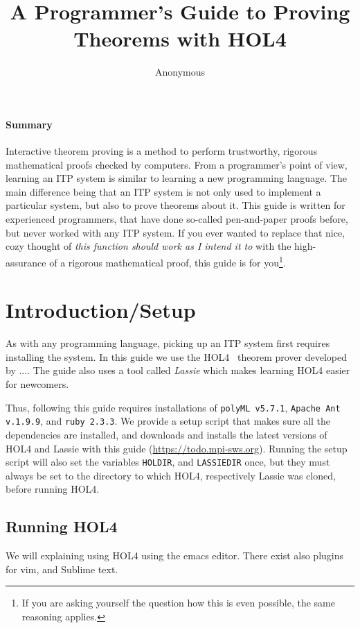 \documentclass[10pt]{scrartcl}
\title{A Programmer's Guide to Proving Theorems with HOL4}
\author{Anonymous}
\date{}
\begin{document}
\maketitle{}

\paragraph*{Summary}
Interactive theorem proving is a method to perform trustworthy, rigorous
mathematical proofs checked by computers.
From a programmer's point of view, learning an ITP system is similar to
learning a new programming language.
The main difference being that an ITP system is not only used to implement
a particular system, but also to prove theorems about it.
This guide is written for experienced programmers, that have done so-called
pen-and-paper proofs before, but never worked with any ITP system.
If you ever wanted to replace that nice, cozy thought of \emph{this function
should work as I intend it to} with the high-assurance of a rigorous
mathematical proof, this guide is for you\footnote{If you are asking yourself the question how this is even possible, the same reasoning applies.}.

\section{Introduction/Setup}
%
As with any programming language, picking up an ITP system first requires
installing the system.
In this guide we use the HOL4~\cite{HOL4web} theorem prover developed by ....
The guide also uses a tool called \emph{Lassie} which makes learning HOL4 easier
for newcomers.

Thus, following this guide requires installations of \texttt{polyML v5.7.1},
\texttt{Apache Ant v.1.9.9}, and \texttt{ruby 2.3.3}.
We provide a setup script that makes sure all the dependencies are installed,
and downloads and installs the latest versions of HOL4 and Lassie with this
guide (\url{https://todo.mpi-sws.org}).
Running the setup script will also set the variables \texttt{HOLDIR}, and
\texttt{LASSIEDIR} once, but they must always be set to the directory to which
HOL4, respectively Lassie was cloned, before running HOL4.

\subsection{Running HOL4}

We will explaining using HOL4 using the emacs editor.
There exist also plugins for vim, and Sublime text.
\end{document}
